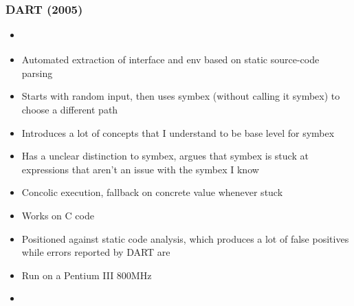 \documentclass[12pt]{article}
\begin{document}
\subsubsection{DART (2005)}
\begin{itemize}
    \item \cite{DART}
    \item Automated extraction of interface and env based on static source-code parsing
    \item Starts with random input, then uses symbex (without calling it symbex) to choose a different path
    \item Introduces a lot of concepts that I understand to be base level for symbex
    \item Has a unclear distinction to symbex, argues that symbex is stuck at expressions that aren't an issue with the symbex I know
    \item Concolic execution, fallback on concrete value whenever stuck
    \item Works on C code
    \item Positioned against static code analysis, which produces a lot of false positives while errors reported by DART are \cite{DART}
    \item Run on a Pentium III 800MHz
    \item {}\cite{DART}
\end{itemize}
\end{document}
